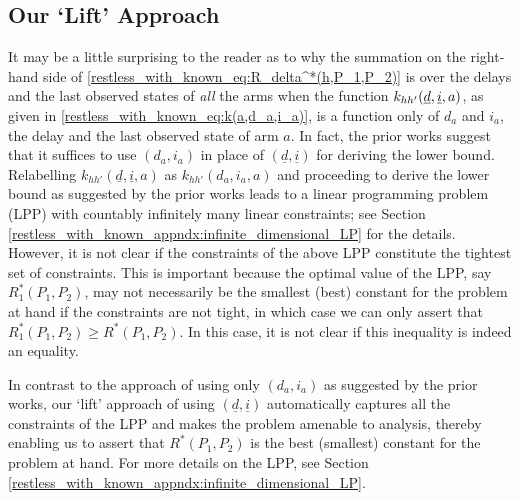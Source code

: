 \subsection{Our `Lift' Approach}
It may be a little surprising to the reader as to why the summation on the right-hand side of \eqref{restless_with_known_eq:R_delta^*(h,P_1,P_2)} is over the delays and the last observed states of \emph{all} the arms when the function $\textcolor{black}{k_{hh'}(\underline{d}, \underline{i}, a)}$, as given in \eqref{restless_with_known_eq:k(a,d_a,i_a)}, is a function only of $d_a$ and $i_a$, the delay and the last observed state of arm $a$. In fact, the prior works  \cite{Vaidhiyan2017, vaidhiyan2012active, vaidhiyan2017learning, prabhu2017optimal} suggest that it suffices to use $(d_a, i_a)$ in place of $(\underline{d}, \underline{i})$ for deriving the lower bound. Relabelling $k_{hh'}(\underline{d}, \underline{i}, a)$ as $k_{hh'}(d_a, i_a, a)$ and proceeding to derive the lower bound as suggested by the prior works leads to a linear programming problem (LPP) with countably infinitely many linear constraints; see Section \ref{restless_with_known_appndx:infinite_dimensional_LP} for the details. However, it is not clear if the constraints of the above LPP constitute the tightest set of constraints. This is important because the optimal value of the LPP, say $R_1^*(P_1, P_2)$, may not necessarily be the smallest (best) constant for the problem at hand if the constraints are not tight, in which case we can only assert that $R_1^*(P_1, P_2) \geq R^*(P_1, P_2)$. In this case, it is not clear if this inequality is indeed an equality. 

In contrast to the approach of using only $(d_a, i_a)$ as suggested by the prior works, our `lift' approach of using $(\underline{d}, \underline{i})$ automatically captures all the constraints of the LPP and makes the problem amenable to analysis, thereby enabling us to assert that $R^*(P_1, P_2)$ is the best (smallest) constant for the problem at hand. For more details on the LPP, see Section \ref{restless_with_known_appndx:infinite_dimensional_LP}.

